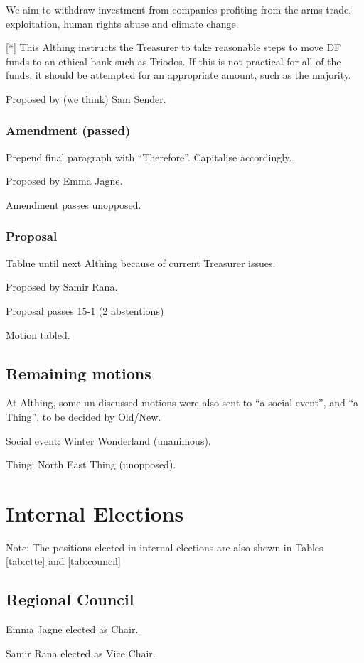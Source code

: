 \documentclass[a4paper, 12pt]{article}
\begin{document}
We aim to withdraw investment from companies profiting from the arms trade, exploitation, human rights abuse and climate change.

[*] This Althing instructs the Treasurer to take reasonable steps to move DF funds to an ethical bank such as Triodos. If this is not practical for all of the funds, it should be attempted for an appropriate amount, such as the majority.

Proposed by (we think) Sam Sender.

\subsubsection{Amendment (passed)}
Prepend final paragraph with ``Therefore''. Capitalise accordingly.

Proposed by Emma Jagne.

Amendment passes unopposed.

\subsubsection{Proposal}
Tablue until next Althing because of current Treasurer issues.

Proposed by Samir Rana.

Proposal passes 15-1 (2 abstentions)

Motion tabled.

\subsection{Remaining motions}
At Althing, some un-discussed motions were also sent to ``a social event'', and ``a Thing'', to be decided by Old/New.

Social event: Winter Wonderland (unanimous).

Thing: North East Thing (unopposed).

\section{Internal Elections}
Note: The positions elected in internal elections are also shown in Tables \ref{tab:ctte} and \ref{tab:council}
\subsection{Regional Council}
Emma Jagne elected as Chair.

Samir Rana elected as Vice Chair.
\end{document}
